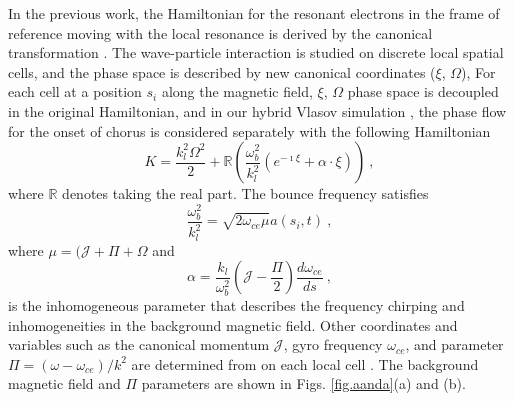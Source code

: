 In the previous work, the Hamiltonian for the resonant electrons in the frame of reference moving with the local resonance is derived by the canonical transformation \cite{zheng2024}.
The wave-particle interaction is studied on discrete local spatial cells, and the phase space is described by new canonical coordinates ($\xi$, $\Omega$), 
For each cell at a position $s_i$ along the magnetic field, $\xi$, $\Omega$ phase space is decoupled in the original Hamiltonian, and in our hybrid Vlasov simulation \cite{zheng2024,zheng2023b}, the phase flow for the onset of chorus is considered separately with the following Hamiltonian
\begin{equation}\label{eq.H_lab}
    K = \frac{k_l^2\Omega^2}{2} + \mathbb{R}\left(\frac{\omega_b^2}{k_l^2} (e^{-\imath \xi} + \alpha \cdot \xi) \right)~,
\end{equation}
where $\mathbb{R}$ denotes taking the real part.
The bounce frequency satisfies
\begin{equation}
    \frac{\omega_b^2}{k_l^2} = \sqrt{2\omega_{ce}\mu}a(s_i,t)~,
\end{equation}
where $\mu = (\mathcal{J}+\Pi+\Omega$ and 
\begin{equation}\label{eq.alpold}
   \alpha  = \frac{k_l}{\omega_b^2}(\mathcal{J} - \frac{\Pi}{2}) \frac{d\omega_{ce}}{ds}~,
\end{equation}
is the inhomogeneous parameter that describes the frequency chirping and inhomogeneities in the background magnetic field.
Other coordinates and variables such as the canonical momentum $\mathcal{J}$, gyro frequency $\omega_{ce}$, and parameter $\Pi = (\omega - \omega_{ce})/k^2$ are determined from on each local cell \cite{zheng2024,zheng2023b}.
The background magnetic field and $\Pi$ parameters are shown in Figs. \ref{fig.aanda}(a) and (b).


